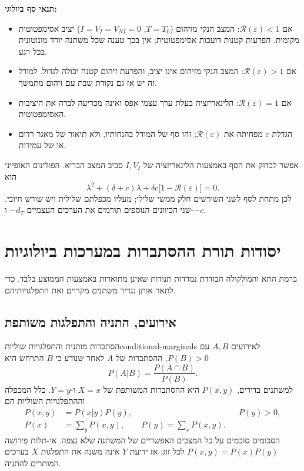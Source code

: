 \textbf{תנאי סף ביולוגי:}
\begin{itemize}
\item אם $\mathcal R(\varepsilon)<1$: המצב הנקי מזיהום ($T=T_0$, $I=V_I=V_{NI}=0$) יציב אסימפטוטית מקומית. הפרעות קטנות דועכות אסימפטוטית; אין בכך טענה שכל משתנה יורד מונוטונית בכל רגע.
\item אם $\mathcal R(\varepsilon)>1$: המצב הנקי מזיהום אינו יציב, והפרעת זיהום קטנה יכולה לגדול. למודל זה יש אז גם נקודת שבת עם זיהום מתמשך.
\item אם $\mathcal R(\varepsilon)=1$: הלינאריזציה בעלת ערך עצמי אפס ואינה מכריעה לבדה את היציבות האסימפטוטית.
\item הגדלת $\varepsilon$ מפחיתה את $\mathcal R(\varepsilon)$; זהו סף של המודל בהנחותיו, ולא תיאור של מאגר רדום או של עמידות.
\end{itemize}

אפשר לבדוק את הסף באמצעות הלינאריזציה של $I,V_I$ סביב המצב הבריא. הפולינום האופייני הוא
\begin{equation}\label{eq:hiv4-threshold-polynomial}
\lambda^2+(\delta+c)\lambda+\delta c\bigl[1-\mathcal R(\varepsilon)\bigr]=0.
\end{equation}
לכן מתחת לסף לשני השורשים חלק ממשי שלילי; מעליו מכפלתם שלילית ויש שורש חיובי. שני הכיוונים הנוספים תורמים את הערכים העצמיים $-d_T$ ו-$-c$.

\section{יסודות תורת ההסתברות במערכות ביולוגיות}\label{sec:probability-foundations}
ברמת התא והמולקולה הבודדת נמדדות תנודות שאינן מתוארות באמצעות הממוצע בלבד. כדי לתאר אותן נגדיר משתנים מקריים ואת התפלגויותיהם.

\subsection{אירועים, התניה והתפלגות משותפת}
\begin{definition}{הסתברות מותנית והתפלגויות שוליות}{conditional-marginals}
לאירועים $A,B$ עם $P(B)>0$, ההסתברות של $A$ לאחר שנודע כי $B$ התרחש היא
\begin{equation}\label{eq:conditional-event}
P(A|B)=\frac{P(A\cap B)}{P(B)}.
\end{equation}
למשתנים בדידים, $P(x,y)$ היא ההסתברות המשותפת של $X=x$ ו-$Y=y$. כלל המכפלה וההתפלגויות השוליות הם
\begin{align}
P(x,y)&=P(x|y)P(y), &&P(y)>0,\label{eq:joint-product}\\
P(x)&=\sum_y P(x,y),\qquad P(y)=\sum_x P(x,y).\label{eq:marginalization}
\end{align}
הסכומים סוכמים על כל המצבים האפשריים של המשתנה שלא נצפה. אי-תלות פירושה $P(x,y)=P(x)P(y)$ לכל זוג; אז ידיעת $Y$ אינה משנה את התפלגות $X$ בערכים המותרים להתניה.
\end{definition}

